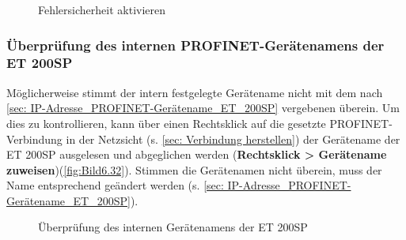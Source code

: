 \begin{figure}[H]
   \centering
   \caption[Fehlersicherheit aktivieren]{Fehlersicherheit aktivieren}
   \label{fig:Bild6.31}
\end{figure}

\subsubsection{Überprüfung des internen PROFINET-Gerätenamens der ET 200SP}
Möglicherweise stimmt der intern festgelegte Gerätename nicht mit dem nach \autoref{sec: IP-Adresse_PROFINET-Gerätename_ET_200SP} vergebenen überein. Um dies zu kontrollieren, kann über einen Rechtsklick auf die gesetzte PROFINET-Verbindung in der Netzsicht (s. \autoref{sec: Verbindung herstellen}) der Gerätename der ET 200SP ausgelesen und abgeglichen werden (\textbf{Rechtsklick > Gerätename zuweisen})(\autoref{fig:Bild6.32}).  Stimmen die Gerätenamen nicht überein, muss der Name entsprechend geändert werden (s. \autoref{sec: IP-Adresse_PROFINET-Gerätename_ET_200SP}).

\begin{figure}[H]
   \centering
   \caption[Überprüfung des internen Gerätenamens der ET 200SP]{Überprüfung des internen Gerätenamens der ET 200SP}
   \label{fig:Bild6.32}
\end{figure}

